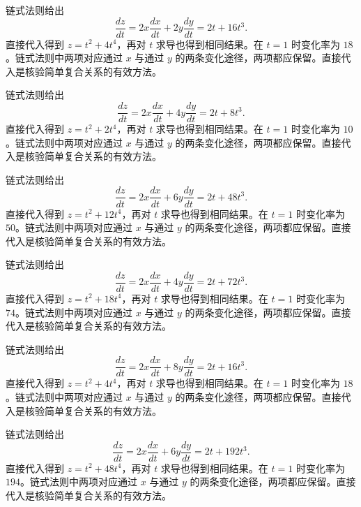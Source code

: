 \documentclass[12pt,fontset=fandol]{ctexart}
\begin{document}
\begin{solve}\label{ans:c34q2}
链式法则给出
\[
\frac{dz}{dt}=2x\frac{dx}{dt}+2y\frac{dy}{dt}=2t+16t^3.
\]
直接代入得到 $z=t^2+4t^4$，再对 $t$ 求导也得到相同结果。在 $t=1$ 时变化率为 $18$。链式法则中两项对应通过 $x$ 与通过 $y$ 的两条变化途径，两项都应保留。直接代入是核验简单复合关系的有效方法。
\end{solve}

\begin{solve}\label{ans:c34q3}
链式法则给出
\[
\frac{dz}{dt}=2x\frac{dx}{dt}+4y\frac{dy}{dt}=2t+8t^3.
\]
直接代入得到 $z=t^2+2t^4$，再对 $t$ 求导也得到相同结果。在 $t=1$ 时变化率为 $10$。链式法则中两项对应通过 $x$ 与通过 $y$ 的两条变化途径，两项都应保留。直接代入是核验简单复合关系的有效方法。
\end{solve}

\begin{solve}\label{ans:c34q4}
链式法则给出
\[
\frac{dz}{dt}=2x\frac{dx}{dt}+6y\frac{dy}{dt}=2t+48t^3.
\]
直接代入得到 $z=t^2+12t^4$，再对 $t$ 求导也得到相同结果。在 $t=1$ 时变化率为 $50$。链式法则中两项对应通过 $x$ 与通过 $y$ 的两条变化途径，两项都应保留。直接代入是核验简单复合关系的有效方法。
\end{solve}

\begin{solve}\label{ans:c34q5}
链式法则给出
\[
\frac{dz}{dt}=2x\frac{dx}{dt}+4y\frac{dy}{dt}=2t+72t^3.
\]
直接代入得到 $z=t^2+18t^4$，再对 $t$ 求导也得到相同结果。在 $t=1$ 时变化率为 $74$。链式法则中两项对应通过 $x$ 与通过 $y$ 的两条变化途径，两项都应保留。直接代入是核验简单复合关系的有效方法。
\end{solve}

\begin{solve}\label{ans:c34q6}
链式法则给出
\[
\frac{dz}{dt}=2x\frac{dx}{dt}+8y\frac{dy}{dt}=2t+16t^3.
\]
直接代入得到 $z=t^2+4t^4$，再对 $t$ 求导也得到相同结果。在 $t=1$ 时变化率为 $18$。链式法则中两项对应通过 $x$ 与通过 $y$ 的两条变化途径，两项都应保留。直接代入是核验简单复合关系的有效方法。
\end{solve}

\begin{solve}\label{ans:c34q7}
链式法则给出
\[
\frac{dz}{dt}=2x\frac{dx}{dt}+6y\frac{dy}{dt}=2t+192t^3.
\]
直接代入得到 $z=t^2+48t^4$，再对 $t$ 求导也得到相同结果。在 $t=1$ 时变化率为 $194$。链式法则中两项对应通过 $x$ 与通过 $y$ 的两条变化途径，两项都应保留。直接代入是核验简单复合关系的有效方法。
\end{solve}
\end{document}
